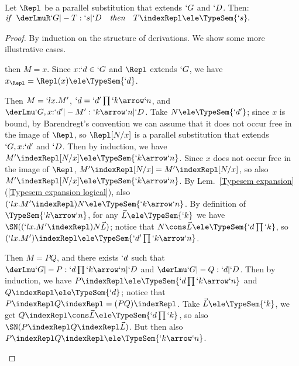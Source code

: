 \documentclass{CSML}
\newcommand{\vect}[1]{\vec{#1}}
\begin{document}

 \begin{lem} \label{lem:replacement}
Let $ \Repl $ be a parallel substitution that extends $`G$ and $`D $.
Then:
%
 $ \begin{array}{@{}rcl}
 \textit{if }~ \derLmuR `G |- T : `s | `D &\textit{then}& T \indexRepl \ele \TypeSem{`s}. 
 \end{array} $
 \end{lem}


 \begin{proof}
By induction on the structure of derivations. 
We show some more illustrative cases. 

 \begin{description} \itemsep 4pt

 \item[$\Ax$] then $M = x$.
Since $x{:}`d \in`G$ and $\Repl $ extends $`G$, we have $x_{\Repl} = \Repl (x) \ele \TypeSem{`d}$.



 \item [$\Abs$] Then $M = `lx.M'$, $`d = `d'\prod `k\arrow`n $, and $ \derLmu `G,x{:}`d' |- M' : `k\arrow`n | `D $.
Take $N \ele \TypeSem{`d'}$; since $x$ is bound, by Barendregt's convention we can assume that it does not occur free in the image of $ \Repl $, so $ \Repl [ N/x ] $ is a %
parallel substitution that extends $`G, x{:}`d'$ and $`D$.
Then by induction, we have $M'{\indexRepl [ N/x ]} \ele \TypeSem{`k\arrow`n}$.
Since $x$ does not occur free in the image of $ \Repl $, $M'{\indexRepl [ N/x ] } = M'{\indexRepl}[N/x]$, so also $M'{\indexRepl}[N/x] \ele \TypeSem{`k\arrow`n}$.
%
By Lem.~\ref{Typesem expansion}\,(\ref{Typesem expansion logical}), also
$(`lx.M'{\indexRepl})N \ele \TypeSem{`k\arrow`n}$.
By definition of $ \TypeSem{`k\arrow`n}$, for any $ \vect{L} \ele \TypeSem{`k}$ we have $\SN({ (`lx.M'{\indexRepl} )N \vect{L} })$; notice that $N \cons \vect{L} \ele \TypeSem{`d \prod `k}$, so
$(`lx.M'){\indexRepl} \ele \TypeSem{`d'\prod `k\arrow`n}$.



 \item[$\App$]
Then $M = PQ$, and there exists $`d$ such that $ \derLmu `G |- P : `d\prod `k\arrow`n | `D $ and $ \derLmu `G |- Q : `d | `D $.
Then by induction, we have $P{\indexRepl} \ele \TypeSem{`d\prod `k\arrow`n}$ and $Q{\indexRepl} \ele \TypeSem{`d}$; notice that $P{\indexRepl}Q{\indexRepl} = (PQ){\indexRepl}$.
Take $ \vect{L} \ele \TypeSem{`k}$, we get $Q{\indexRepl} \cons \vect{L} \ele \TypeSem{`d\prod `k}$, so also $ \SN( P{\indexRepl}Q{\indexRepl} \vect{L} ) $.
But then also $P{\indexRepl}Q{\indexRepl} \ele \TypeSem{`k\arrow `n}$.



\end{description}
\end{proof}
\end{document}
